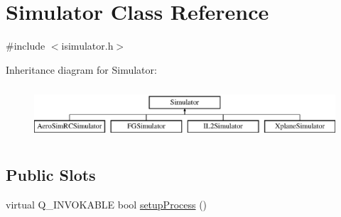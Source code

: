 \hypertarget{class_simulator}{\section{\-Simulator \-Class \-Reference}
\label{class_simulator}
}


{\ttfamily \#include $<$isimulator.\-h$>$}

\-Inheritance diagram for \-Simulator\-:\begin{figure}[H]
\begin{center}
\leavevmode
\includegraphics[height=2.000000cm]{class_simulator}
\end{center}
\end{figure}
\subsection*{\-Public \-Slots}
\begin{DoxyCompactItemize}
\item 
virtual \-Q\-\_\-\-I\-N\-V\-O\-K\-A\-B\-L\-E bool \hyperlink{group___h_i_t_l_plugin_ga25516220ab21d874ae00dd9a21c3e313}{setup\-Process} ()
\end{DoxyCompactItemize}
